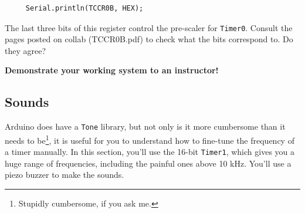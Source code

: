 \documentclass[11pt]{article} %
\begin{document}
\begin{enumerate}
\begin{verbatim}
     Serial.println(TCCR0B, HEX);
\end{verbatim}

The last three bits of this register control the pre-scaler for \verb|Timer0|. Consult the pages posted on collab (TCCR0B.pdf) to check what the bits correspond to. Do they agree?
\end{enumerate}

{\bf Demonstrate your working system to an instructor!}

\subsection{Sounds}

Arduino does have a \verb|Tone| library, but not only is it more cumbersome than it needs to be\footnote{Stupidly cumbersome, if you ask me.}, it is useful for you to understand how to fine-tune the frequency of a timer manually. In this section, you’ll use the 16-bit \verb|Timer1|, which gives you a huge range of frequencies, including the painful ones above 10 kHz. You’ll use a piezo buzzer to make the sounds.
\end{document}
